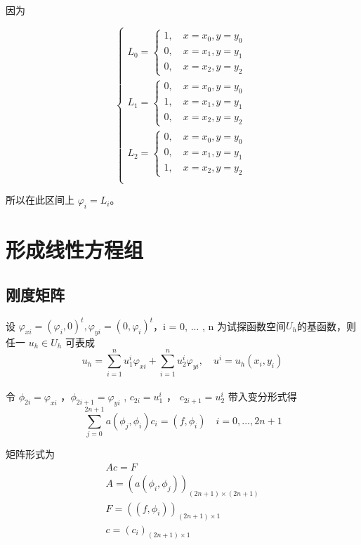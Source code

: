 \documentclass[UTF8,titlepage,twocolumn]{ctexart}
\begin{document}
因为

$$
\begin{cases}
	L_0 = \begin{cases}
			 1, \quad x = x_0, y = y_0 \\
			 0, \quad x = x_1, y = y_1 \\
			 0, \quad x = x_2, y = y_2
		  \end{cases} \\
	L_1 = \begin{cases}
			 0, \quad x = x_0, y = y_0 \\
			 1, \quad x = x_1, y = y_1 \\
			 0, \quad x = x_2, y = y_2
		  \end{cases} \\
	L_2 = \begin{cases}
			 0, \quad x = x_0, y = y_0 \\
			 0, \quad x = x_1, y = y_1 \\
			 1, \quad x = x_2, y = y_2
		  \end{cases} \\
\end{cases}
$$

所以在此区间上 $\varphi_i = L_i$。

\section{形成线性方程组}

\subsection{刚度矩阵}

设 $\varphi_{xi} = (\varphi_i, 0)^t, \varphi_{yi} = (0,\varphi_i)^t$，i = 0, ... , n 为试探函数空间$U_h$的基函数，则任一 $u_h \in U_h$ 可表成
$$
	u_h = \sum\limits_{i=1}^n u^{i}_1 \varphi_{xi} + \sum\limits_{i=1}^n u^{i}_2 \varphi_{yi}, \quad u^i = u_h(x_i,y_i)
$$ 
\\ 
令 $\phi_{2i} = \varphi_{xi}$ ，$\phi_{2i+1} = \varphi_{yi}$ , $c_{2i} = u^i_1$ ， $c_{2i+1} = u^i_2$
带入变分形式得
$$
	\sum\limits_{j=0}^{2n+1} a(\phi_j, \phi_i) c_i = (f,\phi_i) \quad i=0, ... ,2n+1
$$

矩阵形式为
$$
\begin{matrix}
	A c = F \\
	A = (a(\phi_i, \phi_j))_{(2n+1) \times (2n+1)} \\
	F = ((f,\phi_i))_{(2n+1) \times 1} \\
	c = (c_i)_{(2n+1) \times 1}
\end{matrix}
$$
\end{document}
